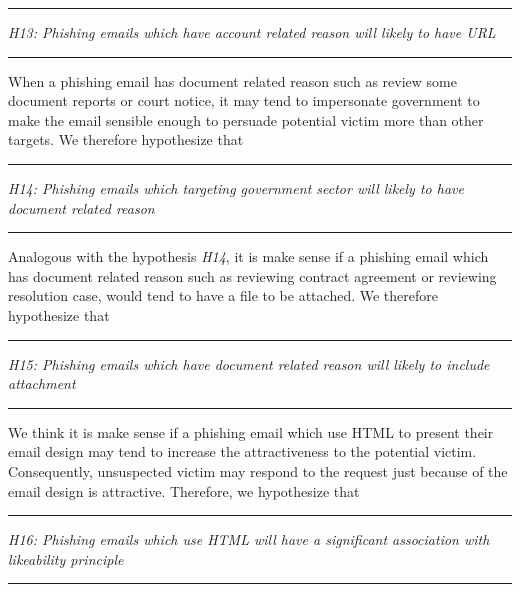 \rule[0.5ex]{1\columnwidth}{1pt}

\textit{H13: Phishing emails which have account related reason will
likely to have URL }

\rule[0.5ex]{1\columnwidth}{1pt}

When a phishing email has document related reason such as review some
document reports or court notice, it may tend to impersonate government
to make the email sensible enough to persuade potential victim more
than other targets. We therefore hypothesize that

\rule[0.5ex]{1\columnwidth}{1pt}

\textit{H14: Phishing emails which targeting government sector will
likely to have document related reason }

\rule[0.5ex]{1\columnwidth}{1pt}

Analogous with the hypothesis \textit{H14}, it is make sense if a
phishing email which has document related reason such as reviewing
contract agreement or reviewing resolution case, would tend to have
a file to be attached. We therefore hypothesize that

\rule[0.5ex]{1\columnwidth}{1pt}

\textit{H15: Phishing emails which have document related reason will
likely to include attachment}

\rule[0.5ex]{1\columnwidth}{1pt}

We think it is make sense if a phishing email which use HTML to present
their email design may tend to increase the attractiveness to the
potential victim. Consequently, unsuspected victim may respond to
the request just because of the email design is attractive. Therefore,
we hypothesize that

\rule[0.5ex]{1\columnwidth}{1pt}

\textit{H16: Phishing emails which use HTML will have a significant
association with likeability principle}

\rule[0.5ex]{1\columnwidth}{1pt}%

